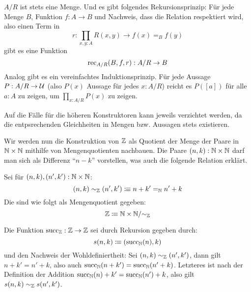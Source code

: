 \begin{bemerkung}
  $A / R$ ist stets eine Menge. Und es gibt folgendes Rekursionsprinzip:
  Für jede Menge $B$, Funktion $f:A\to B$ und Nachweis, dass die Relation respektiert wird,
  also einen Term in
  \[
    r:\prod_{x,y:A}R(x,y)\to f(x)=_B f(y)
  \]
  gibt es eine Funktion
  \[
    \mathrm{rec}_{A / R}(B,f,r) : A / R \to B
  \]
  Analog gibt es ein vereinfachtes Induktionsprinzip.
  Für jede Aussage $P:A / R \to \mathcal{U}$ (also $P(x)$ Aussage für jedes $x:A / R$) reicht es $P([a])$ für alle $a:A$ zu zeigen, um $\prod_{x:A / R}P(x)$ zu zeigen.
\end{bemerkung}
\begin{beweis}
  Auf die Fälle für die höheren Konstruktoren kann jeweils verzichtet werden, da die entpsrechenden Gleichheiten in Mengen bzw. Aussagen stets existieren.
\end{beweis}

Wir werden nun die Konstruktion von $\Z$ als Quotient der Menge der Paare in $\mathbb{N}\times \mathbb{N}$ mithilfe von Mengenquotienten nachbauen.
Die Paare $(n,k):\mathbb{N}\times\mathbb{N}$ darf man sich als Differenz ``$n-k$'' vorstellen, was auch die folgende Relation erklärt.

\begin{definition}
  Sei für $(n,k),(n',k'):\mathbb{N}\times\mathbb{N}$:
  \[
    (n,k) \sim_{\mathbb{Z}} (n',k')\vcentcolon\mspace{-1.2mu}\equiv n+k'=_{\mathbb{N}} n'+k
  \]
  Die \index{$\Z$} sind wie folgt als Mengenquotient gegeben:
  \[
    \mathbb{Z}\vcentcolon\mspace{-1.2mu}\equiv \mathbb{N}\times\mathbb{N} / {\sim_{\mathbb{Z}}}
  \]
\end{definition}

\begin{definition}
  Die Funktion $\mathrm{succ}_{\mathbb{Z}}:\mathbb{Z} \to \mathbb{Z}$ sei durch Rekursion gegeben durch:
  \[
    s(n,k)\vcentcolon\mspace{-1.2mu}\equiv (\mathrm{succ}_{\mathbb{N}}(n),k) 
  \]
  und den Nachweis der Wohldefiniertheit:
  Sei $(n,k)\sim_{\mathbb{Z}} (n',k')$, dann gilt $n+k'=n'+k$, also auch $\mathrm{succ}_{\mathbb{N}}(n+k')=\mathrm{succ}_{\mathbb{N}}(n'+k)$.
  Letzteres ist nach der Definition der Addition $\mathrm{succ}_{\mathbb{N}}(n)+k'=\mathrm{succ}_{\mathbb{N}}(n')+k$, also gilt $s(n,k)\sim_{\mathbb{Z}} s(n',k')$.
\end{definition}

